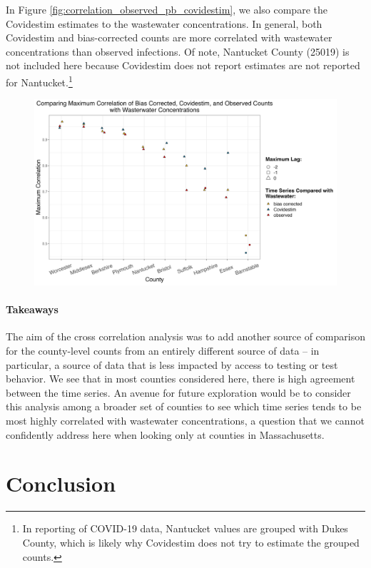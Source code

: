 \documentclass[12pt,twoside]{smiththesis}
\begin{document}
In Figure \ref{fig:correlation_observed_pb_covidestim}, we also compare the Covidestim estimates to the wastewater concentrations. In general, both Covidestim and bias-corrected counts are more correlated with wastewater concentrations than observed infections. Of note, Nantucket County (25019) is not included here because Covidestim does not report estimates are not reported for Nantucket.\footnote{In reporting of COVID-19 data, Nantucket values are grouped with Dukes County, which is likely why Covidestim does not try to estimate the grouped counts.}
\begin{figure}
\includegraphics[width=1\linewidth]{figure/correlation_observed_pb_covidestim} \caption{\label{fig:correlation_observed_pb_covidestim}}\label{fig:unnamed-chunk-103}
\end{figure}
\hypertarget{takeaways}{%
\subsubsection{Takeaways}\label{takeaways}}

The aim of the cross correlation analysis was to add another source of comparison for the county-level counts from an entirely different source of data -- in particular, a source of data that is less impacted by access to testing or test behavior. We see that in most counties considered here, there is high agreement between the time series. An avenue for future exploration would be to consider this analysis among a broader set of counties to see which time series tends to be most highly correlated with wastewater concentrations, a question that we cannot confidently address here when looking only at counties in Massachusetts.

\hypertarget{conclusion}{%
\chapter{Conclusion}\label{conclusion}}
\end{document}
